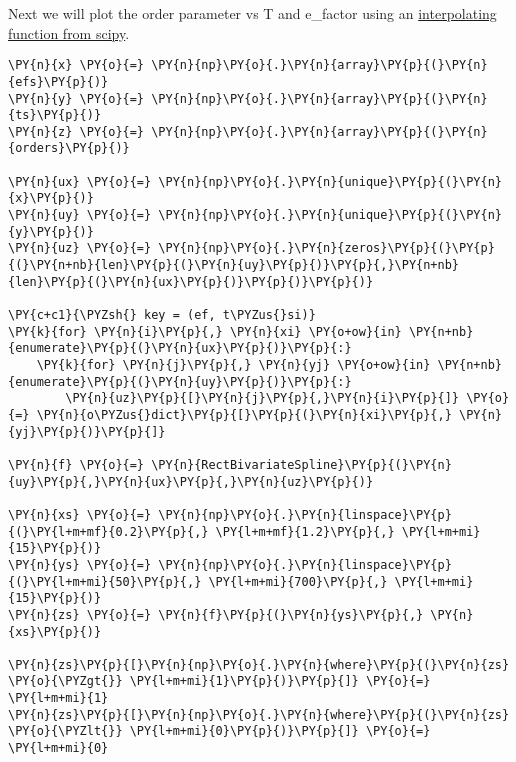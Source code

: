    Next we will plot the order parameter vs T and e\_factor using an
\href{https://docs.scipy.org/doc/scipy/reference/generated/scipy.interpolate.RectBivariateSpline.html\#scipy-interpolate-rectbivariatespline}{interpolating
function from scipy}.

    \begin{tcolorbox}[breakable, size=fbox, boxrule=1pt, pad at break*=1mm,colback=cellbackground, colframe=cellborder]
\begin{Verbatim}[commandchars=\\\{\}]
\PY{n}{x} \PY{o}{=} \PY{n}{np}\PY{o}{.}\PY{n}{array}\PY{p}{(}\PY{n}{efs}\PY{p}{)}
\PY{n}{y} \PY{o}{=} \PY{n}{np}\PY{o}{.}\PY{n}{array}\PY{p}{(}\PY{n}{ts}\PY{p}{)}
\PY{n}{z} \PY{o}{=} \PY{n}{np}\PY{o}{.}\PY{n}{array}\PY{p}{(}\PY{n}{orders}\PY{p}{)}

\PY{n}{ux} \PY{o}{=} \PY{n}{np}\PY{o}{.}\PY{n}{unique}\PY{p}{(}\PY{n}{x}\PY{p}{)}
\PY{n}{uy} \PY{o}{=} \PY{n}{np}\PY{o}{.}\PY{n}{unique}\PY{p}{(}\PY{n}{y}\PY{p}{)}
\PY{n}{uz} \PY{o}{=} \PY{n}{np}\PY{o}{.}\PY{n}{zeros}\PY{p}{(}\PY{p}{(}\PY{n+nb}{len}\PY{p}{(}\PY{n}{uy}\PY{p}{)}\PY{p}{,}\PY{n+nb}{len}\PY{p}{(}\PY{n}{ux}\PY{p}{)}\PY{p}{)}\PY{p}{)}

\PY{c+c1}{\PYZsh{} key = (ef, t\PYZus{}si)}
\PY{k}{for} \PY{n}{i}\PY{p}{,} \PY{n}{xi} \PY{o+ow}{in} \PY{n+nb}{enumerate}\PY{p}{(}\PY{n}{ux}\PY{p}{)}\PY{p}{:}
    \PY{k}{for} \PY{n}{j}\PY{p}{,} \PY{n}{yj} \PY{o+ow}{in} \PY{n+nb}{enumerate}\PY{p}{(}\PY{n}{uy}\PY{p}{)}\PY{p}{:}
        \PY{n}{uz}\PY{p}{[}\PY{n}{j}\PY{p}{,}\PY{n}{i}\PY{p}{]} \PY{o}{=} \PY{n}{o\PYZus{}dict}\PY{p}{[}\PY{p}{(}\PY{n}{xi}\PY{p}{,} \PY{n}{yj}\PY{p}{)}\PY{p}{]}

\PY{n}{f} \PY{o}{=} \PY{n}{RectBivariateSpline}\PY{p}{(}\PY{n}{uy}\PY{p}{,}\PY{n}{ux}\PY{p}{,}\PY{n}{uz}\PY{p}{)}

\PY{n}{xs} \PY{o}{=} \PY{n}{np}\PY{o}{.}\PY{n}{linspace}\PY{p}{(}\PY{l+m+mf}{0.2}\PY{p}{,} \PY{l+m+mf}{1.2}\PY{p}{,} \PY{l+m+mi}{15}\PY{p}{)}
\PY{n}{ys} \PY{o}{=} \PY{n}{np}\PY{o}{.}\PY{n}{linspace}\PY{p}{(}\PY{l+m+mi}{50}\PY{p}{,} \PY{l+m+mi}{700}\PY{p}{,} \PY{l+m+mi}{15}\PY{p}{)}
\PY{n}{zs} \PY{o}{=} \PY{n}{f}\PY{p}{(}\PY{n}{ys}\PY{p}{,} \PY{n}{xs}\PY{p}{)}

\PY{n}{zs}\PY{p}{[}\PY{n}{np}\PY{o}{.}\PY{n}{where}\PY{p}{(}\PY{n}{zs} \PY{o}{\PYZgt{}} \PY{l+m+mi}{1}\PY{p}{)}\PY{p}{]} \PY{o}{=} \PY{l+m+mi}{1}
\PY{n}{zs}\PY{p}{[}\PY{n}{np}\PY{o}{.}\PY{n}{where}\PY{p}{(}\PY{n}{zs} \PY{o}{\PYZlt{}} \PY{l+m+mi}{0}\PY{p}{)}\PY{p}{]} \PY{o}{=} \PY{l+m+mi}{0}


\end{Verbatim}
\end{tcolorbox}
